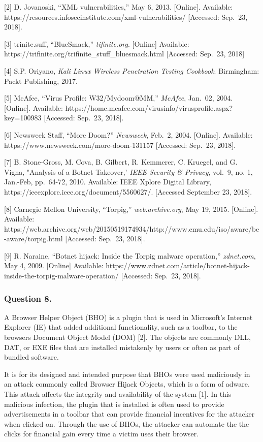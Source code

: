 \documentclass[11pt]{article}
\begin{document}
{[}2{]} D. Jovanoski, ``XML vulnerabilities,'' May 6, 2013.
{[}Online{]}. Available:
https://resources.infosecinstitute.com/xml-vulnerabilities/ {[}Accessed:
Sep.~23, 2018{]}.

{[}3{]} trinite.suff, ``BlueSmack,'' \emph{tifinite.org}. {[}Online{]}
Available: https://trifinite.org/trifinite\_stuff\_bluesmack.html
{[}Accessed: Sep.~23, 2018{]}

{[}4{]} S.P. Oriyano, \emph{Kali Linux Wireless Penetration Testing
Cookbook}. Birmingham: Packt Publishing, 2017.

{[}5{]} McAfee, ``Virus Profile: W32/Mydoom@MM,'' \emph{McAfee},
Jan.~02, 2004. {[}Online{]}. Available:
https://home.mcafee.com/virusinfo/virusprofile.aspx?key=100983
{[}Accessed: Sep.~23, 2018{]}.

{[}6{]} Newsweek Staff, ``More Doom?'' \emph{Newsweek}, Feb.~2, 2004.
{[}Online{]}. Available: https://www.newsweek.com/more-doom-131157
{[}Accessed: Sep.~23, 2018{]}.

{[}7{]} B. Stone-Gross, M. Cova, B. Gilbert, R. Kemmerer, C. Kruegel,
and G. Vigna, "Analysis of a Botnet Takeover,' \emph{IEEE Security \&
Privacy}, vol.~9, no. 1, Jan.-Feb, pp.~64-72, 2010. Available: IEEE
Xplore Digital Library, https://ieeexplore.ieee.org/document/5560627/.
{[}Accessed September 23, 2018{]}.

{[}8{]} Carnegie Mellon University, ``Torpig,'' \emph{web.archive.org},
May 19, 2015. {[}Online{]}. Available:
https://web.archive.org/web/20150519174934/http://www.cmu.edu/iso/aware/be-aware/torpig.html
{[}Accessed: Sep.~23, 2018{]}.

{[}9{]} R. Naraine, ``Botnet hijack: Inside the Torpig malware
operation,'' \emph{zdnet.com}, May 4, 2009. {[}Online{]} Available:
https://www.zdnet.com/article/botnet-hijack-inside-the-torpig-malware-operation/
{[}Accessed: Sep.~23, 2018{]}.

    \hypertarget{question-8.}{%
\subsubsection{Question 8.}\label{question-8.}}

    A Browser Helper Object (BHO) is a plugin that is used in Microsoft's
Internet Explorer (IE) that added additional functionality, such as a
toolbar, to the browsers Document Object Model (DOM) {[}2{]}. The
objects are commonly DLL, DAT, or EXE files that are installed
mistakenly by users or often as part of bundled software.

It is for its designed and intended purpose that BHOs were used
maliciously in an attack commonly called Browser Hijack Objects, which
is a form of adware. This attack affects the integrity and availability
of the system {[}1{]}. In this malicious infection, the plugin that is
installed is often used to provide advertisements in a toolbar that can
provide financial incentives for the attacker when clicked on. Through
the use of BHOs, the attacker can automate the the clicks for financial
gain every time a victim uses their browser.
\end{document}
